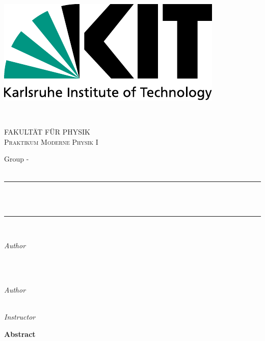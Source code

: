 \begin{titlepage}

	\newcommand{\Hrule}{\rule{\linewidth}{0.5mm}}
	\begin{minipage}{0.5\textwidth}
		\begin{flushleft}
			\includegraphics[width=.5\textwidth]{../praktikum-protokollvorlage-latex/include/logo.pdf}
		\end{flushleft}
	\end{minipage}
	~
	\begin{minipage}{0.5\textwidth}
		\begin{flushright}
			\textsc{FAKULTÄT FÜR PHYSIK\\Praktikum Moderne Physik I}
		\end{flushright}
	\end{minipage}\par

	\center
	{\LARGE Group \wochentag-\gruppennr}\\[1.5cm]
	{\large \durchgefuehrt}\\[0.5cm]

	\Hrule\\[0.4cm]
	{\huge\bfseries \versuch}\\[0.2cm]
	\Hrule\\[1.5cm]

	\begin{minipage}{0.4\textwidth}
		\begin{flushleft}
			\large
			\textit{Author}\\
			\vornamea\ \textsc{\nachnamea}\\
			\texttt{\emailA}
		\end{flushleft}
	\end{minipage}
	~
	\begin{minipage}{0.4\textwidth}
		\begin{flushright}
			\large
			\textit{Author}\\
			\vornameb\ \textsc{\nachnameb}\\
			\texttt{\emailB}
		\end{flushright}
	\end{minipage}\par
	\vspace{1cm}
	\textit{Instructor}\\
	\betreuer

	\vfill\vfill
	{\LARGE \textbf{Abstract}}\\[0.4cm]

	\abstract

\end{titlepage}
